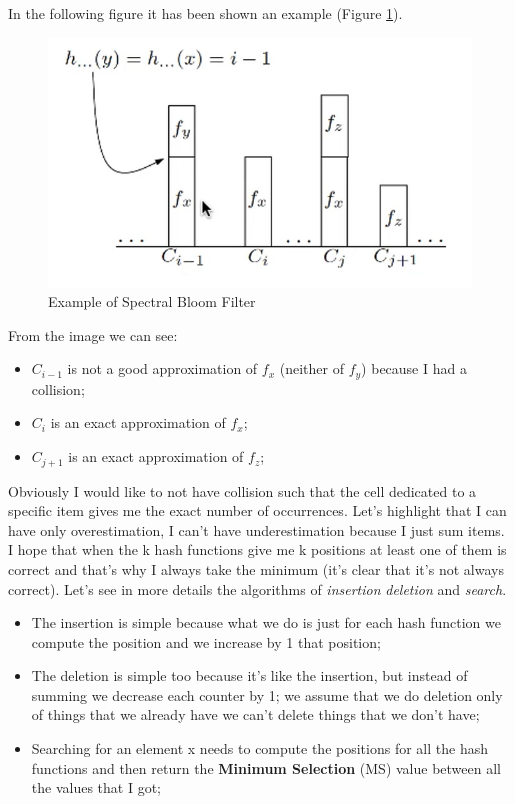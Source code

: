 In the following figure it has been shown an example (Figure \ref{fig:minimumselection}).
\begin{figure}
    \centering
    \includegraphics[width=0.75\linewidth]{images/minimumselection.png}
    \caption{Example of Spectral Bloom Filter}
    \label{fig:minimumselection}
\end{figure}
From the image we can see:
\begin{itemize}
    \item $C_{i-1}$ is not a good approximation of $f_x$ (neither of $f_y$) because I had a collision;
    \item $C_i$ is an exact approximation of $f_x$;
    \item $C_{j+1}$ is an exact approximation of $f_z$;
\end{itemize}
Obviously I would like to not have collision such that the cell dedicated to a specific item gives me the exact number of occurrences. Let's highlight that I can have only overestimation, I can't have underestimation because I just sum items. I hope that when the k hash functions give me k positions at least one of them is correct and that's why I always take the minimum (it's clear that it's not always correct).\newline
Let's see in more details the algorithms of \textit{insertion} \textit{deletion} and \textit{search}.
\begin{itemize}
    \item The insertion is simple because what we do is just for each hash function we compute the position and we increase by 1 that position;
    \item The deletion is simple too because it's like the insertion, but instead of summing we decrease each counter by 1; we assume that we do deletion only of things that we already have we can't delete things that we don't have;
    \item Searching for an element x needs to compute the positions for all the hash functions and then return the \textbf{Minimum Selection} (MS) value between all the values that I got;
\end{itemize}
